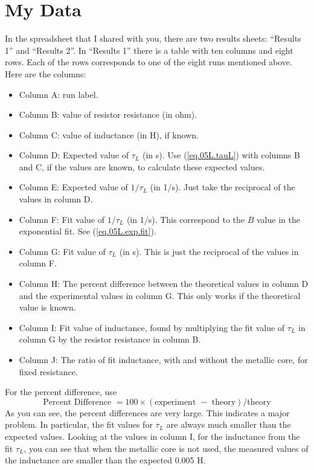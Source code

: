 \section{My Data}
%
In the spreadsheet that I shared with you, there are two results sheets: ``Results 1'' and ``Results 2''. In ``Results 1'' there is a table with ten columns and eight rows. Each of the rows corresponds to one of the eight runs mentioned above. Here are the columns:
\begin{itemize}
	\item Column A: run label.
	\item Column B: value of resistor resistance (in ohm).
	\item Column C: value of inductance (in H), if known.
	\item Column D: Expected value of $\tau_{L}$ (in s). Use (\ref{eq.05L.tauL}) with columns B and C, if the values are known, to calculate these expected values.
	\item Column E: Expected value of $1 / \tau_{L}$ (in 1/s). Just take the reciprocal of the values in column D.
	\item Column F: Fit value of $1 / \tau_{L}$ (in 1/s). This correspond to the $B$ value in the exponential fit. See (\ref{eq.05L.exp.fit}).
	\item Column G: Fit value of $\tau_{L}$ (in s). This is just the reciprocal of the values in column F.
	\item Column H: The percent difference between the theoretical values in column D and the experimental values in column G. This only works if the theoretical value is known.
	\item Column I: Fit value of inductance, found by multiplying the fit value of $\tau_{L}$ in column G by the resistor resistance in column B.
	\item Column J: The ratio of fit inductance, with and without the metallic core, for fixed resistance.
\end{itemize}
For the percent difference, use
\begin{equation}
	\text{Percent Difference } = 100 \times (\text{experiment } - \text{ theory}) / \text{theory}
\end{equation}
As you can see, the percent differences are very large. This indicates a major problem. In particular, the fit values for $\tau_{L}$ are always much smaller than the expected values. Looking at the values in column I, for the inductance from the fit $\tau_{L}$, you can see that when the metallic core is not used, the measured values of the inductance are smaller than the expected 0.005 H.

